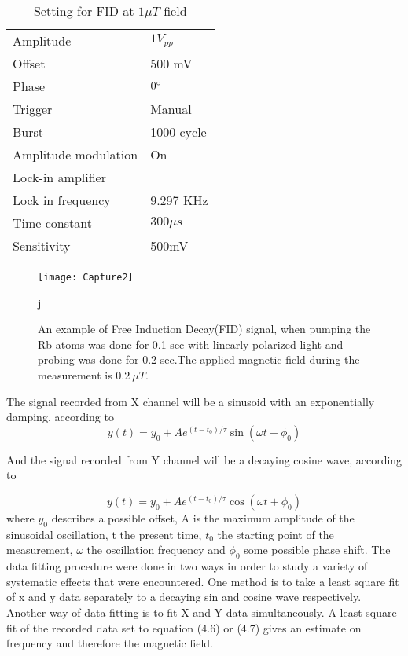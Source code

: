 \documentclass[12pt]{report}
\begin{document}
\begin{itemize}
\begin{table}[h]
\begin{tabular}{|l |l|}
Amplitude   &  $1V_{pp}$  \\
Offset  &       500 mV  \\
Phase       &    $0\degree$ \\
Trigger     &   Manual  \\
Burst       &    1000 cycle \\
Amplitude modulation & On \\
\hline
Lock-in amplifier &     \\
\hline
Lock in frequency     & 9.297 KHz \\
Time constant     &  $300\mu s$ \\
Sensitivity      &  500mV  \\
\hline
\end{tabular}
\caption{Setting for FID at $1\mu T$ field}
\end{table}
\begin{figure}[h]
\centering\texttt{[image: Capture2]}
\caption{ An example of Free Induction Decay(FID) signal, when pumping the Rb atoms  was done for 0.1 sec with linearly polarized light and probing was done for 0.2 sec.The applied magnetic field during the measurement is $0.2~\mu T$. }j
\end{figure}
The signal recorded  from X channel will be a sinusoid with an exponentially damping, according to   
  \begin{equation}
                                         y(t) = y_0 + A   e^{(t-t_0)/\tau}\sin(\omega t + \phi_0)
\end{equation}  

And the signal recorded  from Y channel will be a decaying cosine wave, according to
                                       
  \begin{equation}
                                         y(t) = y_0 + A   e^{(t-t_0)/\tau}\cos(\omega t + \phi_0)
\end{equation}
where $y_0$ describes a possible offset, A is the maximum amplitude of the sinusoidal oscillation,
t the present time, $t_0$ the starting point of the measurement, $\omega$ the oscillation frequency and $\phi_0$  some possible phase shift. The data fitting procedure were done in two ways in order to study a variety of systematic effects that were encountered. One method is to take a least square fit of x and y data separately to a decaying sin and cosine wave respectively. Another way of data fitting is to fit X and Y data simultaneously. A least square-fit of the recorded data set to equation (4.6) or (4.7) gives an estimate on frequency and  therefore the magnetic field.
\begin{figure}
    \centering
 

\end{figure}
\end{itemize}
\end{document}
